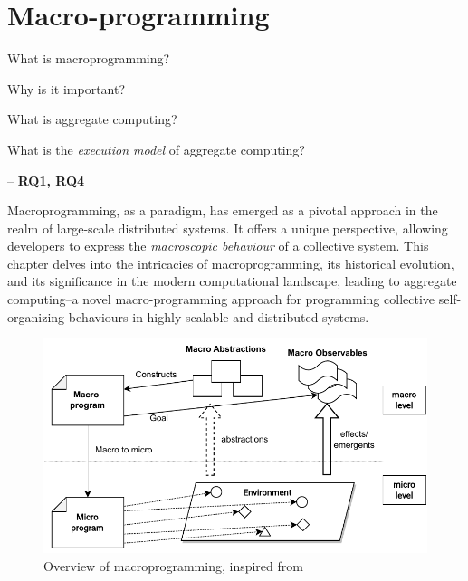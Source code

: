 
\chapter{Macro-programming}\label{chap:macro-programming}%
\begin{flushright}
  \begin{minipage}{0.5\textwidth}
    What is macroprogramming? 
    
    Why is it important? 
    
    What is aggregate computing?
  
    What is the \emph{execution model} of aggregate computing?
  
    -- \textbf{RQ1, RQ4}    
  \end{minipage}
    
\end{flushright}
\minitoc%
\newcommand{\q}[1]{\texttt{#1}}
Macroprogramming, as a paradigm, 
 has emerged as a pivotal approach in the realm of large-scale distributed systems. 
%
It offers a unique perspective, 
 allowing developers to express the \emph{macroscopic behaviour} of a collective system.
% 
This chapter delves into the intricacies of macroprogramming, 
 its historical evolution, and its significance in the modern computational landscape, 
 leading to aggregate computing--a novel macro-programming approach for 
 programming collective self-organizing behaviours in highly scalable and distributed systems.

\begin{figure}
\includegraphics[width=\textwidth]{chapters/img/macroprogramming.drawio}
\caption[Overview of macroprogramming]{Overview of macroprogramming, inspired from~\cite{casadei2023macroprogramming}}\label{macro:fig:macro-programming}
\end{figure}
